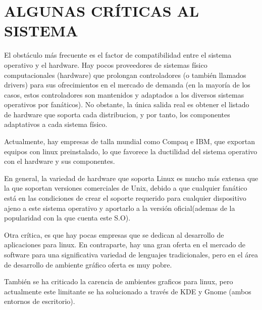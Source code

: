 \section*{ALGUNAS CRÍTICAS AL SISTEMA}

El obstáculo más frecuente es el factor de compatibilidad entre
el sistema operativo y el hardware. Hay pocos proveedores de
sistemas físico computacionales (hardware) que prolongan
controladores (o también llamados drivers) para sus
ofrecimientos en el mercado de demanda (en la mayoría de los
casos, estos controladores son mantenidos y adaptados a los
diversos sistemas operativos por fanáticos). No obstante, la
única salida real es obtener el listado de hardware que soporta
cada distribucion, y por tanto, los componentes adaptativos a
cada sistema físico.

Actualmente, hay empresas de talla mundial como Compaq e
IBM, que exportan equipos con linux preinstalado, lo que
favorece la ductilidad del sistema operativo con el hardware y
sus componentes.

En general, la variedad de hardware que soporta Linux es
mucho más extensa que la que soportan versiones comerciales
de Unix, debido a que cualquier fanático está en las condiciones
de crear el soporte requerido para cualquier dispositivo ajeno a
este sistema operativo y aportarlo a la versión oficial(ademas de
la popularidad con la que cuenta este S.O).

Otra crítica, es que hay pocas empresas que se dedican al
desarrollo de aplicaciones para linux. En contraparte, hay una
gran oferta en el mercado de software para una significativa
variedad de lenguajes tradicionales, pero en el área de
desarrollo de ambiente gráfico oferta es muy pobre.

También se ha criticado la carencia de ambientes graficos para
linux, pero actualmente este limitante se ha solucionado a través
de KDE y Gnome (ambos entornos de escritorio).

